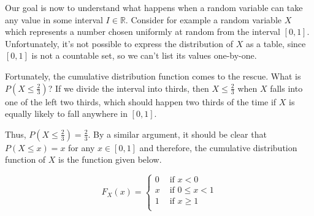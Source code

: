 Our goal is now to understand what happens when a random variable can take any value in some interval $I \in \mathbb{R}$. Consider for example a random variable $X$ which represents a number chosen uniformly at random from the interval $[0,1]$. Unfortunately, it's not possible to express the distribution of $X$ as a table, since $[0,1]$ is not a countable set, so we can't list its values one-by-one.

Fortunately, the cumulative distribution function comes to the rescue. What is $P(X \leq \frac{2}{3})$? If we divide the interval into thirds, then $X \leq \frac{2}{3}$ when $X$ falls into one of the left two thirds, which should happen two thirds of the time if $X$ is equally likely to fall anywhere in $[0,1]$.
\begin{center}
\end{center}

Thus, $P(X \leq \frac{2}{3}) = \frac{2}{3}$. By a similar argument, it should be clear that $P(X \leq x) = x$ for any $x \in [0,1]$ and therefore, the cumulative distribution function of $X$ is the function given below.

\begin{center}
    \begin{minipage}{0.5\textwidth}
        \centering
        \renewcommand*{\arraystretch}{1.35}
$$F_X(x) = \left\{
\begin{array}{cl}
      0 & \text{ if \ } x < 0  \\
      x & \text{ if \ } 0 \leq x < 1  \\
      1 & \text{ if \ } x \geq 1 \\ \end{array}
\right.$$
\vspace{0.75em}
\renewcommand*{\arraystretch}{1}
    \end{minipage}%
    \begin{minipage}{0.5\textwidth}
        \centering
\end{minipage}
\end{center}


